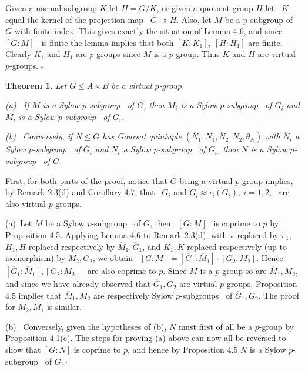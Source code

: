\documentclass[11pt]{article}
\theoremstyle{change}
\newtheorem{Thm}{Theorem}[section]
\newcommand{\<}{\langle}
\renewcommand{\>}{\rangle}
\newcommand{\qed}{\quad\hfill$\square$}
\newcommand{\syl}{Sylow $p$-subgroup }
\newcommand{\syls}{Sylow $p$-subgroups }
\begin{document}
\begin{Proof}
Given a normal subgroup $K$ let $H = G/K$, or given a quotient group $H$ let \ $K$ equal the 
kernel of the projection map \ $G \twoheadrightarrow H$. Also, let $M$ be a p-subgroup of $G$ with
finite index. This gives exactly the situation of Lemma 4.6, and since \ $[G:M]$ \ is finite
the lemma implies that both $[K:K_1], \ [H:H_1]$ are finite. Clearly $K_1$ and $H_1$ are
$p$-groups since $M$ is a $p$-group. Thus $K$ and $H$ are virtual 
$p$-groups. \qed 
\end{Proof}




\begin{Thm}
 Let $G \leq A\times B $ be a virtual $p$-group. 

(a) \ If $M$ is a \syl \ of $G$, then $\overline{M}_i$ is a \syl \ of   
 $\overline{G}_i$ and $M_i$ is a \syl \ of $G_i$.

(b) \ Conversely, if $N \leq G$ has Goursat quintuple 
$(\overline{N}_1, N_1, \overline{N}_2, N_2, \theta_N)$ with
 $\overline{N}_i$  a \syl \ of   
 $\overline{G}_i$ and $N_i$  a \syl \ of $G_i$, then $N$ is a \syl \ of $G$.
\end{Thm}

\begin{Proof}
First, for both parts of the proof, notice that $G$ being a virtual $p$-group
implies, by Remark 2.3(d) and Corollary 4.7, that \ $\overline{G}_i$ and 
$G_i \approx\iota_i(G_i)  , 
\ i = 1,2$, \ are also virtual $p$-groups. 

(a)\  Let $M$ be a \syl \ of $G$, then \ $[G:M]$ \ is coprime to $p$ by 
Proposition 4.5. Applying Lemma 4.6 to Remark 2.3(d), with $\pi$ replaced by $\pi_1$, $H_1, H$ 
replaced respectively by $\overline{M}_1, \overline{G}_1$, and $K_1, K$
replaced respectively (up to isomorphism) by $M_2, G_2$, we obtain
\ $[G:M] = [\overline{G}_1 : \overline{M}_1]\cdot [G_2 : M_2]$. Hence \
$[\overline{G}_1 : \overline{M}_1] , [G_2 : M_2]$ \ are also coprime to $p$.
Since $M$ is a $p$-group so are $\overline{M}_1, M_2$, and since we have
already observed that 
$\overline{G}_1, G_2$ are virtual $p$ groups, Proposition 4.5 implies that
$\overline{M}_1, M_2$ are respectively \syls \ of $\overline{G}_1, G_2$. 
The proof for $\overline{M}_2, M_1$ is similar.

(b) \ Conversely, given the hypotheses of (b), $N$ must first of all be
a $p$-group by Proposition 4.1(c).  The steps for proving (a) above can
now all
be reversed to show that   $[G : N]$ is coprime to $p$, and hence by
Proposition 4.5 $N$ is a \syl \ of $G$. \qed 


\end{Proof}
\end{document}
